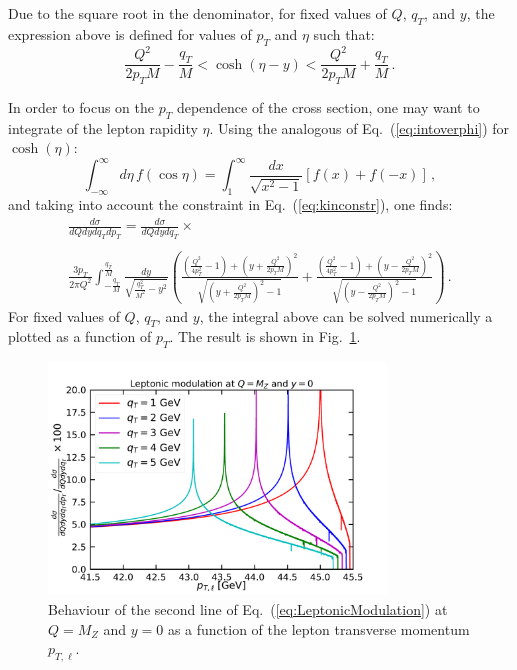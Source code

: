 \documentclass[10pt,a4paper]{article}
\begin{document}
Due to the square root in the denominator, for fixed values of $Q$,
$q_T$, and $y$, the expression above is defined for values of $p_T$
and $\eta$ such that:
\begin{equation}\label{eq:kinconstr}
\frac{Q^2}{2p_TM}-\frac{q_T }{M}< \cosh(\eta-y) < \frac{Q^2}{2p_TM}+\frac{q_T}{M}\,.
\end{equation}

In order to focus on the $p_T$ dependence of the cross section, one
may want to integrate of the lepton rapidity $\eta$. Using the
analogous of Eq.~(\ref{eq:intoverphi}) for $\cosh(\eta)$:
\begin{equation}\label{eq:intovereta}
\int_{-\infty}^{\infty}d\eta\, f(\cos\eta) = \int_{1}^{\infty}\frac{dx}{\sqrt{x^2-1}}\left[f(x)+f(-x)\right]\,,
\end{equation}
and taking into account the constraint in Eq.~(\ref{eq:kinconstr}),
one finds:
\begin{equation}\label{eq:LeptonicModulation}
\begin{array}{l}
\displaystyle \frac{d\sigma}{dQ dy dq_T dp_T} =\frac{d\sigma}{dQ dy
  dq_T} \times\\
\\
\displaystyle\frac
                                                          {3p_T}{2\pi
                                                          Q^2}\int_{-\frac{q_T}{M}}^{\frac{q_T}{M}}
  \frac{dy}{\sqrt{\frac{q_T^2}{M^2}-y^2}}\left(\frac{\left(\frac{Q^2}{4
  p_T^2}-1\right)+\left(y+\frac{Q^2}{2p_TM}\right)^2}{\sqrt{\left(y+\frac{Q^2}{2p_TM}\right)^2-1}}+\frac{\left(\frac{Q^2}{4
  p_T^2}-1\right)+\left(y-\frac{Q^2}{2p_TM}\right)^2}{\sqrt{\left(y-\frac{Q^2}{2p_TM}\right)^2-1}}\right)\,.
\end{array}
\end{equation}
For fixed values of $Q$, $q_T$, and $y$, the integral above can be
solved numerically a plotted as a function of $p_T$. The result is
shown in Fig.~\ref{fig:LeptonicModulation}.
\begin{figure}[t]
  \begin{centering}
    \includegraphics[width=0.8\textwidth]{plots/LeptonicModulation}
    \caption{Behaviour of the second line of
      Eq.~(\ref{eq:LeptonicModulation}) at $Q=M_Z$ and $y=0$ as a
      function of the lepton transverse momentum
      $p_{T,\ell}$.\label{fig:LeptonicModulation}}
  \end{centering}
\end{figure}
\end{document}
